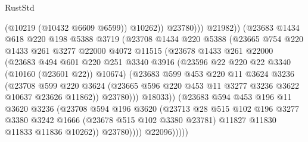 \begin{lexlean}{RustStd}
\begin{coremodule}
                                (@10219 (@10432 @6609 @6599))
                                @10262))
                            @23780)))
                      @21982))
                  (@23683
                    @1434
                    @618
                    @220
                    @198
                    @5388
                    @3719
                    (@23708
                      @1434
                      @220
                      @5388
                      (@23665
                        @754
                        @220
                        @1433
                        @261
                        @3277
                        @22000
                        @4072
                        @11515
                        (@23678
                          @1433
                          @261
                          @22000
                          (@23683
                            @494
                            @601
                            @220
                            @251
                            @3340
                            @3916
                            (@23596 @22 @220 @22 @3340 (@10160 (@23601 @22)) @10674)
                            (@23683
                              @599
                              @453
                              @220
                              @11
                              @3624
                              @3236
                              (@23708
                                @599
                                @220
                                @3624
                                (@23665 @596 @220 @453 @11 @3277 @3236 @3622 @10637 @23626 @11862))
                              @23780)))
                        @18033))
                    (@23683
                      @594
                      @453
                      @196
                      @11
                      @3620
                      @3236
                      (@23708
                        @594
                        @196
                        @3620
                        (@23713
                          @28
                          @515
                          @102
                          @196
                          @3277
                          @3380
                          @3242
                          @1666
                          (@23678 @515 @102 @3380 @23781)
                          @11827
                          @11830
                          @11833
                          @11836
                          @10262))
                      @23780))))
              @22096)))))

\end{coremodule}
\end{lexlean}

